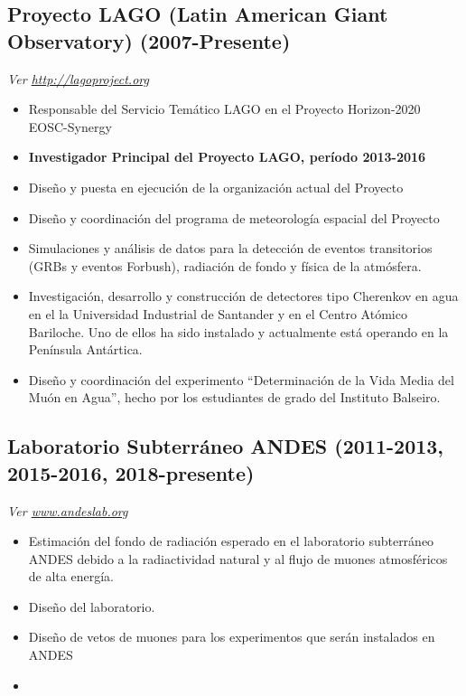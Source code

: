 \subsection*{Proyecto LAGO (Latin American Giant Observatory) (2007-Presente)}
{\small{\textit{Ver \href{http://lagoproject.org}{http://lagoproject.org}}}}
\begin{itemize}

\item Responsable del Servicio Temático LAGO en el Proyecto Horizon-2020 EOSC-Synergy
\item {\bf{Investigador Principal del Proyecto LAGO, período 2013-2016}}
\item Diseño y puesta en ejecución de la organización actual del Proyecto
\item Diseño y coordinación del programa de meteorología espacial del Proyecto
\item Simulaciones y análisis de datos para la detección de eventos transitorios (GRBs y eventos Forbush), radiación de fondo y física de la atmósfera.
\item Investigación, desarrollo y construcción de detectores tipo Cherenkov en agua en el la Universidad Industrial de Santander y en el Centro Atómico Bariloche. Uno de ellos ha sido instalado y actualmente está operando en la Península Antártica.
\item Diseño y coordinación del experimento ``Determinación de la Vida Media del Muón en Agua'', hecho por los estudiantes de grado del Instituto Balseiro.
\end{itemize}
\subsection*{Laboratorio Subterráneo ANDES (2011-2013, 2015-2016, 2018-presente)}
{\small{\textit{Ver \href{http://www.andeslab.org}{www.andeslab.org}}}}
\begin{itemize}
\item Estimación del fondo de radiación esperado en el laboratorio subterráneo ANDES debido a la radiactividad natural y al flujo de muones atmosféricos de alta energía.
\item Diseño del laboratorio.
\item Diseño de vetos de muones para los experimentos que serán instalados en ANDES
\item \end{itemize}

\ifres
\else
